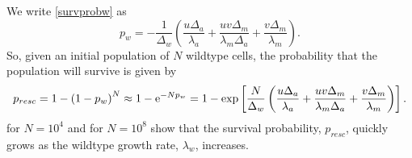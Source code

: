 \documentclass[12pt]{extarticle}
\newcommand{\e}{{\rm e}}
\begin{document}
We write \cref{survprobw} as
\begin{equation}\label{survprobwapprox1}
p_w=-\frac{1}{\Delta_w}\left(\frac{u\Delta_a}{\lambda_a}+\frac{uv\Delta_m}{\lambda_m\Delta_a}+\frac{v\Delta_m}{\lambda_m}\right).
\end{equation}
So, given an initial population of $N$ wildtype cells, the probability that the population will survive is given by
\begin{align}\label{aneuploidyresistentfirstapprox}
p_{resc}=1-\left(1-p_w\right)^N\approx 1-\e^{-Np_w}=1-\exp\left[\frac{N}{\Delta_w}\left(\frac{u\Delta_a}{\lambda_a}+\frac{uv\Delta_m}{\lambda_m\Delta_a}+\frac{v\Delta_m}{\lambda_m}\right)\right] .
\end{align}
 for $N=10^4$ and  for $N=10^8$  show that the survival probability, $p_{resc}$, quickly grows as the wildtype growth rate, $\lambda_w$, increases. %
\end{document}
